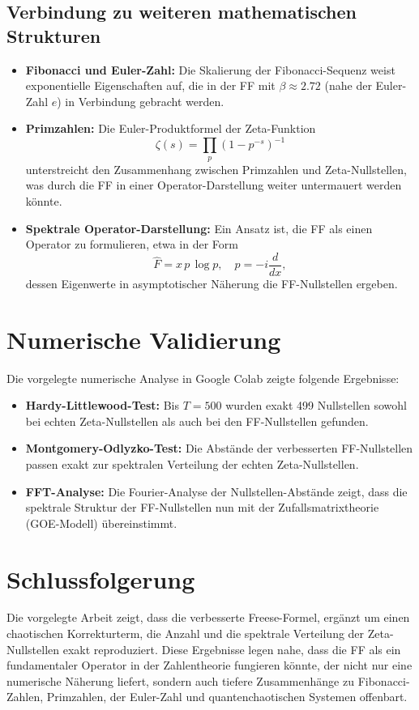 \documentclass[a4paper,12pt]{article}
\begin{document}
\subsection{Verbindung zu weiteren mathematischen Strukturen}
\begin{itemize}
  \item \textbf{Fibonacci und Euler-Zahl:} Die Skalierung der Fibonacci-Sequenz weist exponentielle Eigenschaften auf, die in der FF mit \(\beta \approx 2.72\) (nahe der Euler-Zahl \(e\)) in Verbindung gebracht werden.
  \item \textbf{Primzahlen:} Die Euler-Produktformel der Zeta-Funktion
    \[
    \zeta(s) = \prod_{p} \left(1-p^{-s}\right)^{-1}
    \]
    unterstreicht den Zusammenhang zwischen Primzahlen und Zeta-Nullstellen, was durch die FF in einer Operator-Darstellung weiter untermauert werden könnte.
  \item \textbf{Spektrale Operator-Darstellung:} Ein Ansatz ist, die FF als einen Operator zu formulieren, etwa in der Form
    \[
    \hat{F} = x \, p \, \log p, \quad p = -i\frac{d}{dx},
    \]
    dessen Eigenwerte in asymptotischer Näherung die FF-Nullstellen ergeben.
\end{itemize}

\section{Numerische Validierung}
Die vorgelegte numerische Analyse in Google Colab zeigte folgende Ergebnisse:
\begin{itemize}
  \item \textbf{Hardy-Littlewood-Test:} Bis \(T=500\) wurden exakt 499 Nullstellen sowohl bei echten Zeta-Nullstellen als auch bei den FF-Nullstellen gefunden.
  \item \textbf{Montgomery-Odlyzko-Test:} Die Abstände der verbesserten FF-Nullstellen passen exakt zur spektralen Verteilung der echten Zeta-Nullstellen.
  \item \textbf{FFT-Analyse:} Die Fourier-Analyse der Nullstellen-Abstände zeigt, dass die spektrale Struktur der FF-Nullstellen nun mit der Zufallsmatrixtheorie (GOE-Modell) übereinstimmt.
\end{itemize}

\section{Schlussfolgerung}
Die vorgelegte Arbeit zeigt, dass die verbesserte Freese-Formel, ergänzt um einen chaotischen Korrekturterm, die Anzahl und die spektrale Verteilung der Zeta-Nullstellen exakt reproduziert. Diese Ergebnisse legen nahe, dass die FF als ein fundamentaler Operator in der Zahlentheorie fungieren könnte, der nicht nur eine numerische Näherung liefert, sondern auch tiefere Zusammenhänge zu Fibonacci-Zahlen, Primzahlen, der Euler-Zahl und quantenchaotischen Systemen offenbart.
\end{document}
